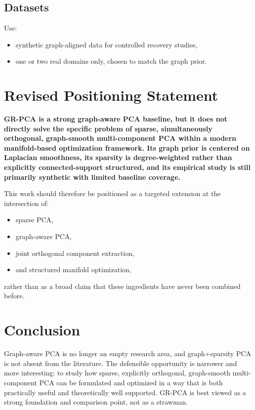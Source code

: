 \documentclass[11pt]{article}
\begin{document}
\subsection{Datasets}

Use:
\begin{itemize}
    \item synthetic graph-aligned data for controlled recovery studies,
    \item one or two real domains only, chosen to match the graph prior.
\end{itemize}

\section{Revised Positioning Statement}

\textbf{GR-PCA is a strong graph-aware PCA baseline, but it does not directly solve the specific problem of sparse, simultaneously orthogonal, graph-smooth multi-component PCA within a modern manifold-based optimization framework. Its graph prior is centered on Laplacian smoothness, its sparsity is degree-weighted rather than explicitly connected-support structured, and its empirical study is still primarily synthetic with limited baseline coverage.}

This work should therefore be positioned as a targeted extension at the intersection of:
\begin{itemize}
    \item sparse PCA,
    \item graph-aware PCA,
    \item joint orthogonal component extraction,
    \item and structured manifold optimization,
\end{itemize}
rather than as a broad claim that these ingredients have never been combined before.

\section{Conclusion}

Graph-aware PCA is no longer an empty research area, and graph+sparsity PCA is not absent from the literature. The defensible opportunity is narrower and more interesting: to study how sparse, explicitly orthogonal, graph-smooth multi-component PCA can be formulated and optimized in a way that is both practically useful and theoretically well supported. GR-PCA is best viewed as a strong foundation and comparison point, not as a strawman.

\printbibliography
\end{document}

